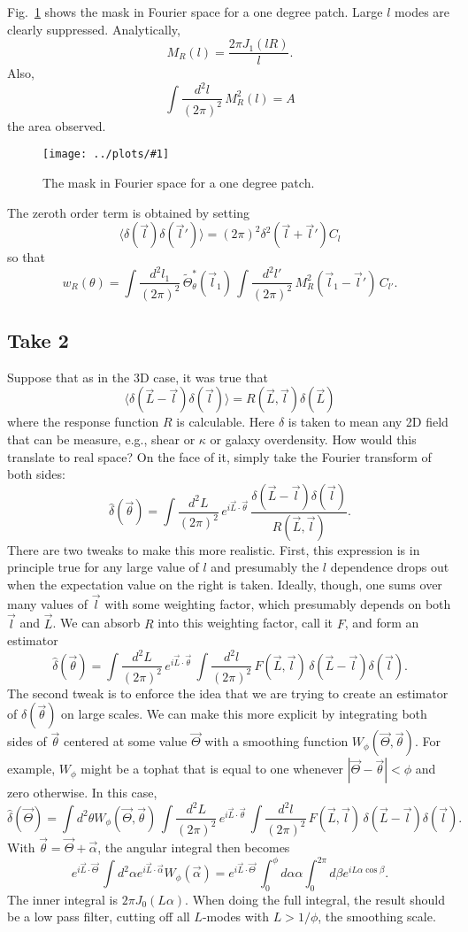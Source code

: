\documentclass[prd,amsmath,amssymb,floatfix,superscriptaddress,nofootinbib]{revtex4-1}
\def\be{\begin{equation}}
\def\ee{\end{equation}}
\newcommand{\rf}[1]{\ref{fig:#1}}
\newcommand{\sfigg}[2]{
\texttt{[image: ../plots/\#1]}
        }
\newcommand{\Spng}[2]{
   \begin{figure}[thbp]
   \begin{center}
    \sfigg{../plots/#1.png}{\columnwidth}
    \caption{{\small #2}}
    \label{fig:#1}
     \end{center}
   \end{figure}
}
\begin{document}
Fig.~\rf{mask} shows the mask in Fourier space for a one degree patch. Large $l$ modes are clearly suppressed. Analytically,
\be
M_R(l) = \frac{2\pi J_1(lR)}{l}.\ee
Also,
\be
\int \frac{d^2l}{(2\pi)^2} \, M_R^2(l) =A\ee
the area observed.
\Spng{mask}{The mask in Fourier space for a one degree patch.}

The zeroth order term is obtained by setting
\be
\langle\delta(\vec l)\delta(\vec l')\rangle = (2\pi)^2\delta^2(\vec l+\vec l') C_l\ee
so that 
\be
w_R(\theta) =  \int \frac{d^2l_1}{(2\pi)^2}\, \tilde \Theta_\theta^*(\vec l_1)\, \int \frac{d^2l'}{(2\pi)^2}\, M_R^2(\vec l_1-\vec l') 
\, C_{l'}
.
\ee

\subsection{Take 2}

Suppose that as in the 3D case, it was true that 
\be
\langle \delta(\vec L-\vec l)\delta(\vec l)\rangle  = R(\vec L,\vec l) \delta (\vec L)\ee
where the response function $R$ is calculable. Here $\delta$ is taken to mean any 2D field that can be measure, e.g., shear or $\kappa$ or galaxy overdensity. 
How would this translate to real space? On the face of it, simply take the Fourier transform of both sides:
\be
\hat \delta(\vec\theta) = \int \frac{d^2L}{(2\pi)^2}\, e^{i\vec L\cdot\vec\theta} \, \frac{\delta(\vec L-\vec l)\delta(\vec l)}{R(\vec L,\vec l) }
.\ee
There are two tweaks to make this more realistic. First, this expression is in principle true for any large value of $l$ and presumably the $l$ dependence drops out when the expectation value on the right is taken. Ideally, though, one sums over many values of $\vec l$ with some weighting factor, which presumably depends on both $\vec l$ and $\vec L$. We can absorb $R$ into this weighting factor, call it $F$, and form an estimator
\be
\hat \delta(\vec\theta) = \int \frac{d^2L}{(2\pi)^2}\, e^{i\vec L\cdot\vec\theta} \, \int \frac{d^2l}{(2\pi)^2}\, F(\vec L,\vec l)\, \delta(\vec L-\vec l)\delta(\vec l)
.\ee
The second tweak is to enforce the idea that we are trying to create an estimator of $\delta(\vec\theta)$ on large scales. We can make this more explicit by integrating both sides of $\vec\theta$ centered at some value $\vec\Theta$ with a smoothing function $W_\phi(\vec\Theta,\vec\theta)$. For example, $W_\phi$ might be a tophat that is equal to one whenever $|\vec\Theta-\vec\theta|<\phi$ and zero otherwise. In this case,
\be
\hat \delta(\vec\Theta) = \int d^2\theta W_\phi(\vec\Theta,\vec\theta)\, \int \frac{d^2L}{(2\pi)^2}\, e^{i\vec L\cdot\vec\theta} \, \int \frac{d^2l}{(2\pi)^2}\, F(\vec L,\vec l)\, \delta(\vec L-\vec l)\delta(\vec l)
.\ee
With $\vec\theta=\vec\Theta+\vec\alpha$, the angular integral then becomes
\be
e^{i\vec L\cdot\vec\Theta}\, \int d^2\alpha e^{i\vec L\cdot\vec\alpha} W_\phi(\vec\alpha)
= e^{i\vec L\cdot\vec\Theta}\, \int_0^\phi d\alpha \alpha \int_0^{2\pi} d\beta e^{iL\alpha\cos\beta}.\ee
The inner integral is $2\pi J_0(L\alpha)$. When doing the full integral, the result should be a low pass filter, cutting off all $L$-modes with $L>1/\phi$, the smoothing scale.
\end{document}
